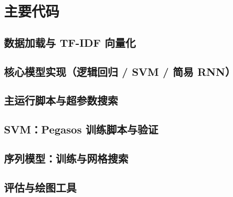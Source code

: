 \section{主要代码}

\subsection{数据加载与 TF-IDF 向量化}


\subsection{核心模型实现（逻辑回归 / SVM / 简易 RNN）}


\subsection{主运行脚本与超参数搜索}



\subsection{SVM：Pegasos 训练脚本与验证}



\subsection{序列模型：训练与网格搜索}



\subsection{评估与绘图工具}


